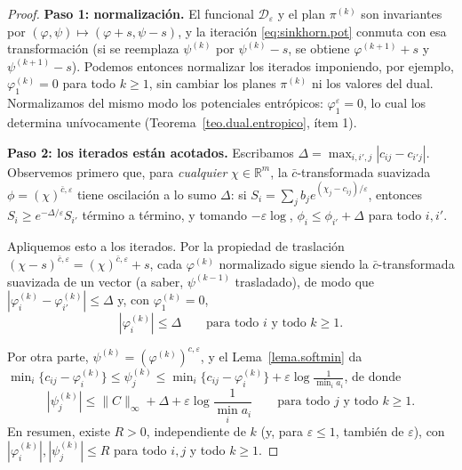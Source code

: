 \documentclass[12pt, a4paper]{amsbook}
\newcommand{\R}{{\mathbb R}}
\theoremstyle{remark}
\theoremstyle{definition}
\numberwithin{section}{chapter}
\numberwithin{subsection}{section}
\numberwithin{equation}{section}
\numberwithin{figure}{chapter}
\begin{document}
\begin{proof}
\textbf{Paso 1: normalización.} El funcional $\mathcal D_\varepsilon$ y el
plan $\pi^{(k)}$ son invariantes por $(\varphi,\psi)\mapsto(\varphi+s,\psi-s)$,
y la iteración \eqref{eq:sinkhorn.pot} conmuta con esa transformación (si
se reemplaza $\psi^{(k)}$ por $\psi^{(k)}-s$, se obtiene $\varphi^{(k+1)}+s$ y
$\psi^{(k+1)}-s$). Podemos entonces normalizar los iterados imponiendo, por
ejemplo, $\varphi^{(k)}_1=0$ para todo $k\ge1$, sin cambiar los planes
$\pi^{(k)}$ ni los valores del dual. Normalizamos del mismo modo los
potenciales entrópicos: $\varphi^\varepsilon_1=0$, lo cual los determina
unívocamente (Teorema~\ref{teo.dual.entropico}, ítem 1).

\medskip
\textbf{Paso 2: los iterados están acotados.} Escribamos
$\Delta=\max_{i,i',j}|c_{ij}-c_{i'j}|$. Observemos primero que, para
\emph{cualquier} $\chi\in\R^m$, la $\bar c$-transformada suavizada
$\phi=(\chi)^{\bar c,\varepsilon}$ tiene oscilación a lo sumo $\Delta$: si
$S_i=\sum_jb_je^{(\chi_j-c_{ij})/\varepsilon}$, entonces
$S_i\ge e^{-\Delta/\varepsilon}S_{i'}$ término a término, y tomando
$-\varepsilon\log$, $\phi_i\le\phi_{i'}+\Delta$ para todo $i,i'$.

Apliquemos esto a los iterados. Por la
propiedad de traslación $(\chi-s)^{\bar c,\varepsilon}=(\chi)^{\bar c,\varepsilon}+s$,
cada $\varphi^{(k)}$ normalizado sigue siendo la $\bar c$-transformada
suavizada de un vector (a saber, $\psi^{(k-1)}$ trasladado), de modo que
$|\varphi^{(k)}_i-\varphi^{(k)}_{i'}|\le\Delta$ y, con $\varphi^{(k)}_1=0$,
\[
|\varphi^{(k)}_i|\le\Delta\qquad\text{para todo }i\text{ y todo }k\ge1.
\]

Por otra parte, $\psi^{(k)}=(\varphi^{(k)})^{c,\varepsilon}$, y el
Lema~\ref{lema.softmin} da
$\min_i\{c_{ij}-\varphi^{(k)}_i\}\le\psi^{(k)}_j\le\min_i\{c_{ij}-\varphi^{(k)}_i\}+\varepsilon\log\frac1{\min_ia_i}$,
de donde
\[
|\psi^{(k)}_j|\le\|C\|_\infty+\Delta+\varepsilon\log\frac1{\min_ia_i}
\qquad\text{para todo }j\text{ y todo }k\ge1.
\]
En resumen, existe $R>0$, independiente de $k$ (y, para $\varepsilon\le1$,
también de $\varepsilon$), con $|\varphi^{(k)}_i|,|\psi^{(k)}_j|\le R$ para
todo $i,j$ y todo $k\ge1$.


\end{proof}
\end{document}
